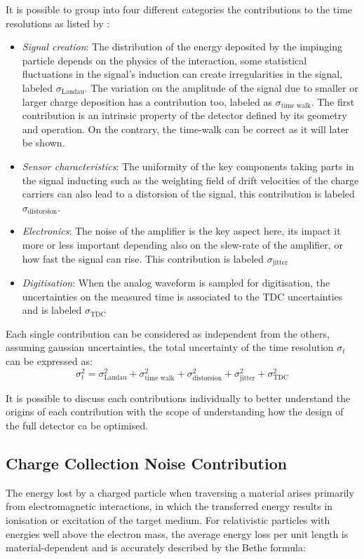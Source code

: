 	It is possible to group into four different categories the contributions to the time resolutions as listed by \cite{timeres_SiliconDetectors}:
	\begin{itemize}
		\item \textit{Signal creation}: The distribution of the energy deposited by the impinging particle depends on the physics of the interaction, some statistical fluctuations in the signal's induction can create irregularities in the signal, labeled $\sigma_{\text{Landau}}$. The variation on the amplitude of the signal due to smaller or larger charge deposition has a contribution too, labeled as $\sigma_{\text{time walk}}$. The first contribution is an intrinsic property of the detector defined by its geometry and operation. On the contrary, the time-walk can be correct as it will later be shown.
		\item \textit{Sensor characteristics}: The uniformity of the key components taking parts in the signal inducting such as the weighting field of drift velocities of the charge carriers can also lead to a distorsion of the signal, this contribution is labeled $\sigma_{\text{distorsion}}$.
		\item \textit{Electronics}: The noise of the amplifier is the key aspect here, its impact it more or less important depending also on the slew-rate of the amplifier, or how fast the signal can rise. This contribution is labeled $\sigma_{\text{jitter}}$
		\item \textit{Digitisation}: When the analog waveform is sampled for digitisation, the uncertainties on the measured time is associated to the TDC uncertainties and is labeled $\sigma_{\text{TDC}}$
	\end{itemize} 
	
	Each single contribution can be considered as independent from the others, assuming gaussian uncertainties, the total uncertainty of the time resolution $\sigma_t$ can be expressed as: 
	\begin{equation}
		\sigma_t^2 = \sigma_{\text{Landau}}^2 + \sigma_{\text{time walk}}^2 + \sigma_{\text{distorsion}}^2 + \sigma_{\text{jitter}}^2 + \sigma_{\text{TDC}}^2
	\end{equation}
	
	It is possible to discuss each contributions individually to better understand the origins of each contribution with the scope of understanding how the design of the full detector ca be optimised. 
	
	 	\subsection{Charge Collection Noise Contribution}
	 	The energy lost by a charged particle when traversing a material arises primarily from electromagnetic interactions, in which the transferred energy results in ionisation or excitation of the target medium. For relativistic particles with energies well above the electron mass, the average energy loss per unit length is material-dependent and is accurately described by the Bethe formula:


